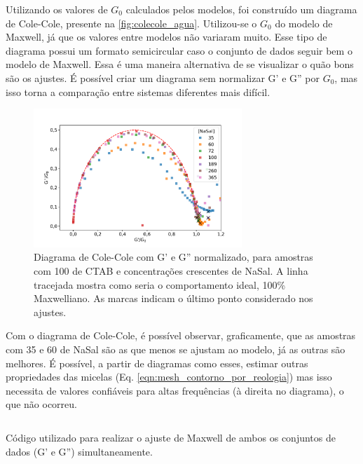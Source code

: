 	Utilizando os valores de \(G_0\) calculados pelos modelos, foi construído um diagrama de Cole-Cole, presente na \autoref{fig:colecole_agua}. Utilizou-se o \(G_0\) do modelo de Maxwell, já que os valores entre modelos não variaram muito. Esse tipo de diagrama possui um formato semicircular caso o conjunto de dados seguir bem o modelo de Maxwell. Essa é uma maneira alternativa de se visualizar o quão bons são os ajustes. É possível criar um diagrama sem normalizar G' e G'' por \(G_0\), mas isso torna a comparação entre sistemas diferentes mais difícil.

		\begin{figure}
			\centering
			\includegraphics[width=0.7\textwidth]{imagens/reologia/colecole_agua}
			\caption{Diagrama de Cole-Cole com G' e G'' normalizado, para amostras com 100 \mM{} de CTAB e concentrações crescentes de NaSal. A linha tracejada mostra como seria o comportamento ideal, 100\% Maxwelliano. As marcas indicam o último ponto considerado nos ajustes.}
			\label{fig:colecole_agua}
		\end{figure}

	Com o diagrama de Cole-Cole, é possível observar, graficamente, que as amostras com 35 e 60 \mM{} de NaSal são as que menos se ajustam ao modelo, já as outras são melhores. É possível, a partir de diagramas como esses, estimar outras propriedades das micelas (Eq. \ref{eqn:mesh_contorno_por_reologia}) mas isso necessita de valores confiáveis para altas frequências (à direita no diagrama), o que não ocorreu. %
	
	\begin{listing}[h]
		\inputminted{python}{./python/ajuste_maxwell.py}
		\caption{Código utilizado para realizar o ajuste de Maxwell de ambos os conjuntos de dados (G' e G'') simultaneamente.}
		\label{lst:ajuste_maxwell}
	\end{listing}
	
